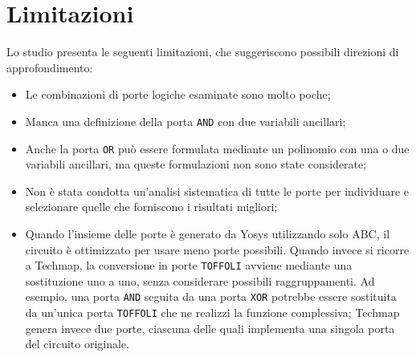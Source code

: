 \documentclass[]{article}
\begin{document}
\section{Limitazioni}\label{sec:limits}
Lo studio presenta le seguenti limitazioni, che suggeriscono possibili direzioni di approfondimento:
\begin{itemize}
	\item Le combinazioni di porte logiche esaminate sono molto poche;
	\item Manca una definizione della porta \texttt{AND} con due variabili ancillari;
	\item Anche la porta \texttt{OR} può essere formulata mediante un polinomio con una o due variabili ancillari, ma queste formulazioni non sono state considerate;
	\item Non è stata condotta un'analisi sistematica di tutte le porte per individuare e selezionare quelle che forniscono i risultati migliori;
	\item Quando l'insieme delle porte è generato da Yosys utilizzando solo ABC, il circuito è ottimizzato per usare meno porte possibili. Quando invece si ricorre a Techmap, la conversione in porte \texttt{TOFFOLI} avviene mediante una sostituzione uno a uno, senza considerare possibili raggruppamenti. Ad esempio, una porta \texttt{AND} seguita da una porta \texttt{XOR} potrebbe essere sostituita da un'unica porta \texttt{TOFFOLI} che ne realizzi la funzione complessiva; Techmap genera invece due porte, ciascuna delle quali implementa una singola porta del circuito originale.
\end{itemize}


\end{document}

